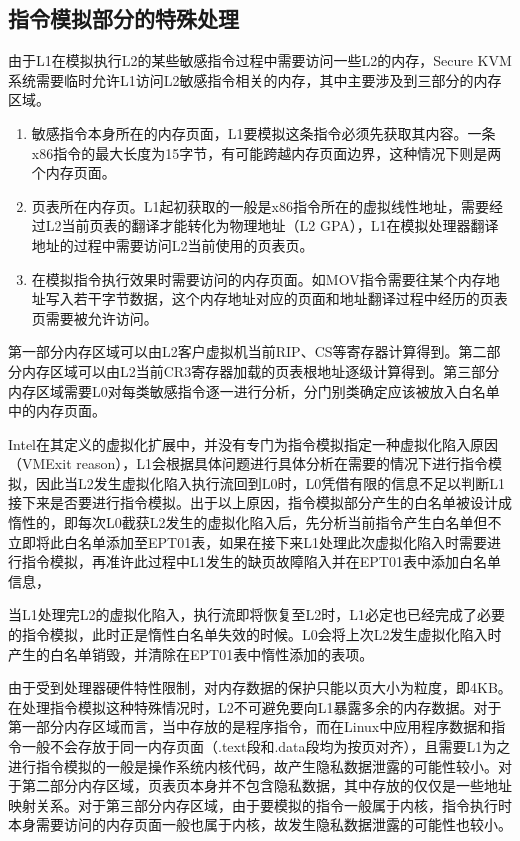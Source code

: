 \subsection{指令模拟部分的特殊处理}

由于L1在模拟执行L2的某些敏感指令过程中需要访问一些L2的内存，Secure KVM系统需要临时允许L1访问L2敏感指令相关的内存，其中主要涉及到三部分的内存区域。

\begin{enumerate}
\item 敏感指令本身所在的内存页面，L1要模拟这条指令必须先获取其内容。一条x86指令的最大长度为15字节，有可能跨越内存页面边界，这种情况下则是两个内存页面。
\item 页表所在内存页。L1起初获取的一般是x86指令所在的虚拟线性地址，需要经过L2当前页表的翻译才能转化为物理地址（L2 GPA），L1在模拟处理器翻译地址的过程中需要访问L2当前使用的页表页。
\item 在模拟指令执行效果时需要访问的内存页面。如MOV指令需要往某个内存地址写入若干字节数据，这个内存地址对应的页面和地址翻译过程中经历的页表页需要被允许访问。
\end{enumerate}

第一部分内存区域可以由L2客户虚拟机当前RIP、CS等寄存器计算得到。第二部分内存区域可以由L2当前CR3寄存器加载的页表根地址逐级计算得到。第三部分内存区域需要L0对每类敏感指令逐一进行分析，分门别类确定应该被放入白名单中的内存页面。

Intel在其定义的虚拟化扩展中，并没有专门为指令模拟指定一种虚拟化陷入原因（VMExit reason），L1会根据具体问题进行具体分析在需要的情况下进行指令模拟，因此当L2发生虚拟化陷入执行流回到L0时，L0凭借有限的信息不足以判断L1接下来是否要进行指令模拟。出于以上原因，指令模拟部分产生的白名单被设计成惰性的，即每次L0截获L2发生的虚拟化陷入后，先分析当前指令产生白名单但不立即将此白名单添加至EPT01表，如果在接下来L1处理此次虚拟化陷入时需要进行指令模拟，再准许此过程中L1发生的缺页故障陷入并在EPT01表中添加白名单信息，

当L1处理完L2的虚拟化陷入，执行流即将恢复至L2时，L1必定也已经完成了必要的指令模拟，此时正是惰性白名单失效的时候。L0会将上次L2发生虚拟化陷入时产生的白名单销毁，并清除在EPT01表中惰性添加的表项。

由于受到处理器硬件特性限制，对内存数据的保护只能以页大小为粒度，即4KB。在处理指令模拟这种特殊情况时，L2不可避免要向L1暴露多余的内存数据。对于第一部分内存区域而言，当中存放的是程序指令，而在Linux中应用程序数据和指令一般不会存放于同一内存页面（.text段和.data段均为按页对齐），且需要L1为之进行指令模拟的一般是操作系统内核代码，故产生隐私数据泄露的可能性较小。对于第二部分内存区域，页表页本身并不包含隐私数据，其中存放的仅仅是一些地址映射关系。对于第三部分内存区域，由于要模拟的指令一般属于内核，指令执行时本身需要访问的内存页面一般也属于内核，故发生隐私数据泄露的可能性也较小。

